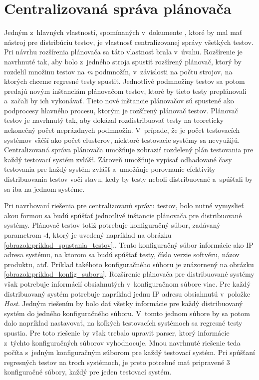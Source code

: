 \section{Centralizovaná správa plánovača}
\label{sekcia:centralizovana_sprava}
Jedným z~hlavných vlastností, spomínaných v~dokumente \cite{Parallel_approach}, ktoré by mal mať nástroj pre distribúciu testov,
je vlastnosť centralizovanej správy všetkých testov. 
Pri návrhu rozšírenia plánovača sa táto vlastnosť brala v~úvahu. 
Rozšírenie je navrhnuté tak, aby bolo z~jedného stroja spustiť rozšírený plánovač, ktorý by rozdelil množinu testov na \emph{m} 
podmnožín, v~závislosti na počtu strojov, na ktorých chceme regresné testy spustiť. Jednotlivé podmnožiny testov sa 
potom predajú novým inštanciám plánovačom testov, ktoré by tieto testy preplánovali a~začali by ich vykonávať. 
Tieto nové inštancie plánovačov sú spustené ako podprocesy hlavného procesu, ktorým je rozšírený plánovač testov.
Plánovač testov je navrhnutý tak, aby dokázal rozdistribuovať testy na teoreticky nekonečný počet neprázdnych podmnožín.
V~prípade, že je počet testovacích systémov väčší ako počet clusterov, niektoré testovacie systémy sa nevyužijú.
Centralizovaná správa plánovača umožňuje zobraziť rozdelený plán testovania pre každý testovací systém zvlášť.
Zároveň umožňuje vypísať odhadované časy testovania pre každý systém zvlášť a~umožňuje porovnanie efektivity distribuovania testov voči stavu,
kedy by testy neboli distribuované a~spúšťali by sa iba na jednom systéme. 

Pri navrhovaní riešenia pre centralizovanú správu testov, bolo nutné vymyslieť akou formou sa budú spúšťať 
jednotlivé inštancie plánovača pre distribuované systémy. Plánovač testov totiž potrebuje konfiguračný súbor,
zadávaný parametrom \textbf{-i}, ktorý je uvedený napríklad na obrázku \ref{obrazok:priklad_spustania_testov}..
Tento konfiguračný súbor informácie ako IP adresa systému, na ktorom sa budú spúšťať testy, číslo verzie softvéru, názov 
produktu, atď. Príklad takéhoto konfiguračného súboru je znázornený na obrázku \ref{obrazok:priklad_konfig_suboru}.
Rozšírenie plánovača pre distribuované systémy však potrebuje informácií obsiahnutých v~konfiguračnom súbore viac.
Pre každý distribuovaný systém potrebuje napríklad jednu IP adresu obsiahnutú v~položke \textit{Host}.
Jedným riešením by bolo dať všetky informácie pre každý distribuovaný systém do jedného konfiguračného súboru.
V~tomto jednom súbore by sa potom dalo napríklad nastavovať, na koľkých testovacích systémoch sa regresné testy spustia.
Pre toto riešenie by však trebalo upraviť parser, ktorý informácie z~týchto konfiguračných súborov vyhodnocuje.
Mnou navrhnuté riešenie teda počíta s~jedným konfiguračným súborom pre každý testovací systém.
Pri spúšťaní regresných testov na troch systémoch, je preto potrebné mať pripravené 3 konfiguračné súbory,
každý pre jeden testovací systém. 

